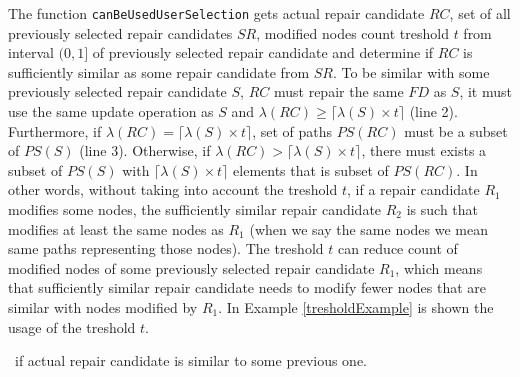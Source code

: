 The function \texttt{canBeUsedUserSelection} gets actual repair candidate $RC$, set of all previously selected repair candidates $SR$, modified nodes count treshold $t$ from interval $(0,1]$ of previously selected repair candidate and determine if $RC$ is sufficiently similar as some repair candidate from $SR$. To be similar with some previously selected repair candidate $S$, $RC$ must repair the same $FD$ as $S$, it must use the same update operation as $S$ and $\lambda(RC) \geq \lceil\lambda(S) \times t\rceil$ (line 2). Furthermore, if $\lambda(RC) = \lceil\lambda(S) \times t\rceil$, set of paths $PS(RC)$ must be a subset of $PS(S)$ (line 3). Otherwise, if $\lambda(RC) > \lceil\lambda(S) \times t\rceil$, there must exists a subset of $PS(S)$ with $\lceil\lambda(S) \times t\rceil$ elements that is subset of $PS(RC)$. In other words, without taking into account the treshold $t$, if a repair candidate $R_1$ modifies some nodes, the sufficiently similar repair candidate $R_2$ is such that modifies at least the same nodes as $R_1$ (when we say the same nodes we mean same paths representing those nodes). The treshold $t$ can reduce count of modified nodes of some previously selected repair candidate $R_1$, which means that sufficiently similar repair candidate needs to modify fewer nodes that are similar with nodes modified by $R_1$. In Example \ref{tresholdExample} is shown the usage of the treshold $t$.


\begin{algorithm}
\caption{$canBeUsedUserSelection(SR, t, RC)$}
\label{canUserSel}
\begin{algorithmic}[1]
\REQUIRE{\ \\
$SR$: set of previously selected repair candidates by the user\\
$t$: suitability treshold $(0,1]$ of previously selected repair candidates\\
$RC$: actual repair candidate}
\ENSURE \TRUE\ if actual repair candidate is similar to some previous one.
            \RETURN \TRUE
        \ENDIF
            \RETURN \TRUE
        \ENDIF
   \ENDIF
\ENDFOR
\RETURN \FALSE
\end{algorithmic}
\end{algorithm}

